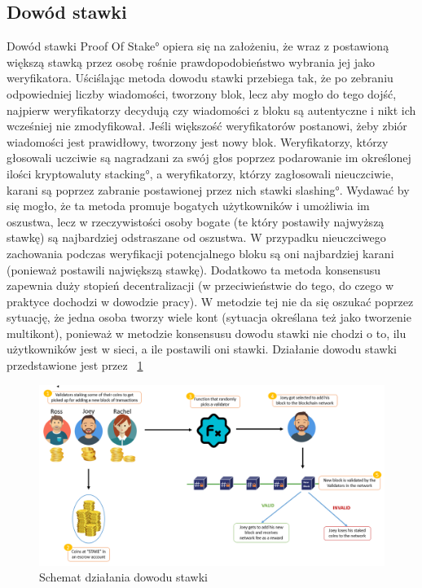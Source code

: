 \subsection{Dowód stawki}
\label{ssec:PoS}
Dowód stawki \ang{Proof Of Stake} opiera się na założeniu, że wraz z postawioną większą stawką przez osobę rośnie prawdopodobieństwo wybrania jej jako weryfikatora. Uściślając metoda dowodu stawki przebiega tak, że po zebraniu odpowiedniej liczby wiadomości, tworzony blok, lecz aby mogło do tego dojść, najpierw weryfikatorzy decydują czy wiadomości z bloku są autentyczne i nikt ich wcześniej nie zmodyfikował. Jeśli większość weryfikatorów postanowi, żeby zbiór wiadomości jest prawidłowy, tworzony jest nowy blok. Weryfikatorzy, którzy głosowali uczciwie są nagradzani za swój głos poprzez podarowanie im określonej ilości kryptowaluty \ang{stacking}, a weryfikatorzy, którzy zagłosowali nieuczciwie, karani są poprzez zabranie postawionej przez nich stawki \ang{slashing}. Wydawać by się mogło, że ta metoda promuje bogatych użytkowników i umożliwia im oszustwa, lecz w rzeczywistości osoby bogate (te który postawiły najwyższą stawkę) są najbardziej odstraszane od oszustwa. W przypadku nieuczciwego zachowania podczas weryfikacji potencjalnego bloku są oni najbardziej karani (ponieważ postawili największą stawkę). Dodatkowo ta metoda konsensusu zapewnia duży stopień decentralizacji (w przeciwieństwie do tego, do czego w praktyce dochodzi w dowodzie pracy). W metodzie tej nie da się oszukać poprzez sytuację, że jedna osoba tworzy wiele kont (sytuacja określana też jako tworzenie multikont), ponieważ w metodzie konsensusu dowodu stawki nie chodzi o to, ilu użytkowników jest w sieci, a ile postawili oni stawki. Działanie dowodu stawki przedstawione jest przez \figurename{~\ref{fig:ConsensusPOS}}
\begin{figure}[h]
    \centering
    \includegraphics[width=\textwidth]{Images/ConsensusPOS.png}
    \caption{Schemat działania dowodu stawki}
    \label{fig:ConsensusPOS}
\end{figure}


